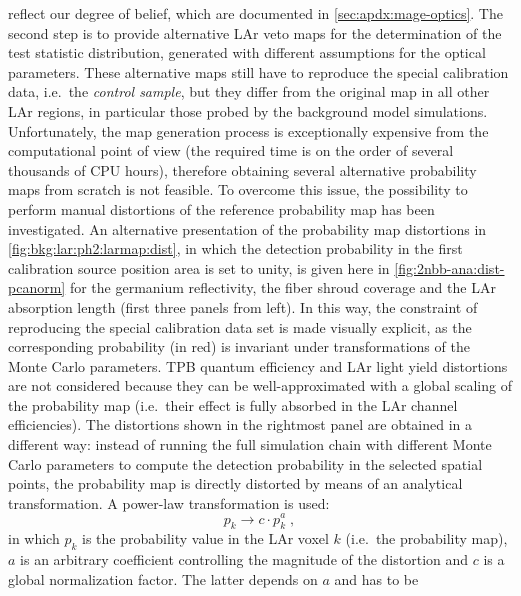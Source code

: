 \begin{description}[wide]
    reflect our degree of belief, which are documented in \cref{sec:apdx:mage-optics}.
    \newpar
    The second step is to provide alternative LAr veto maps for the determination of the
    test statistic distribution, generated with different assumptions for the optical
    parameters. These alternative maps still have to reproduce the special
    calibration data, i.e.~the \emph{control sample}, but they differ from the
    original map in all other LAr regions, in particular those probed by the background
    model simulations.  Unfortunately, the map generation process is exceptionally
    expensive from the computational point of view (the required time is on the order of
    several thousands of CPU hours), therefore obtaining several alternative probability
    maps from scratch is not feasible. To overcome this issue, the possibility to perform
    manual distortions of the reference probability map has been investigated.
    \newpar
    An alternative presentation of the probability map distortions in
    \cref{fig:bkg:lar:ph2:larmap:dist}, in which the detection probability in the first
    calibration source position area is set to unity, is given here in
    \cref{fig:2nbb-ana:dist-pcanorm} for the germanium reflectivity, the fiber shroud
    coverage and the LAr absorption length (first three panels from left). In this way, the
    constraint of reproducing the special calibration data set is made visually explicit,
    as the corresponding probability (in red) is invariant under transformations of the
    Monte Carlo parameters. TPB quantum efficiency and LAr light yield distortions are not
    considered because they can be well-approximated with a global scaling of the
    probability map (i.e.~their effect is fully absorbed in the LAr channel efficiencies).
    The distortions shown in the rightmost panel are obtained in a different way: instead
    of running the full simulation chain with different Monte Carlo parameters to compute
    the detection probability in the selected spatial points, the probability map is
    directly distorted by means of an analytical transformation. A power-law
    transformation is used:
    \begin{equation}\label{eq:2nbb-ana:powerlaw}
      p_k \rightarrow c \cdot p_k^a \;,
    \end{equation}
    in which $p_k$ is the probability value in the LAr voxel $k$ (i.e.~the probability
    map), $a$ is an arbitrary coefficient controlling the magnitude of the distortion
    and $c$ is a global normalization factor. The latter depends on $a$ and has to be

\end{description}
